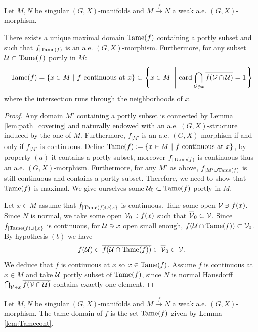 \begin{lem}\label{lem:Tamecont}
Let $M,N$ be singular $(G,X)$-manifolds and $M\xrightarrow{f} N$ a weak a.e. $(G,X)$-morphism.

There exists a unique maximal domain $\mathrm{Tame}(f)$ containing a portly subset and such that $f_{|\mathrm{Tame}(f)}$ is an a.e. $(G,X)$-morphism.
Furthermore, for any subset $\mathcal{U}\subset\mathrm{Tame}(f)$ portly in $M$:  $$\mathrm{Tame}(f) = \{x\in M ~|~ f \text{ continuous at } x\} \subset \left\{x\in M ~\left|~ \mathrm{card}\bigcap_{ \mathcal V \ni x} \overline{f(\mathcal V \cap \mathcal{U})}=1 \right. \right\}$$
where the intersection runs through the neighborhoods of $x$.
\end{lem}
\begin{proof}



Any domain $M'$ containing a portly subset is connected by 
Lemma \ref{lem:path_covering} and naturally endowed with an a.e. $(G,X)$-structure induced by the one of $M$. Furthermore, $f_{|M'}$ is an a.e. $(G,X)$-morphism if and only if $f_{|M'}$ is continuous.
Define $\mathrm{Tame}(f):= \{x\in M ~|~ f \text{ continuous at } x\}$, by property $(a)$ it contains a portly subset, moreover $f_{|\mathrm{Tame}(f)}$ is continuous thus an a.e. $(G,X)$-morphism.
Furthermore, for any $M'$ as above, $f_{|M'\cup\mathrm{Tame}(f)}$ is still continuous and contains a portly subset. 
Therefore, we need to show that $\mathrm{Tame}(f)$ is maximal. We give ourselves some $\mathcal{U}_0 \subset \mathrm{Tame}(f)$ portly in $M$.

Let $x\in M$ assume that $f_{|\mathrm{Tame}(f)\cup \{x\}}$ is continuous. Take some open $\mathcal V\ni f(x)$. Since $N$ is normal, we take some open $\mathcal V_0\ni f(x)$ such that $\overline {\mathcal V}_0 \subset \mathcal V$. Since $f_{|\mathrm{Tame}(f)\cup\{x\}}$ is continuous, for $\mathcal{U}\ni x $ open small enough,  $f(\mathcal{U}\cap \mathrm{Tame}(f))\subset \mathcal V_0$. By  hypothesis $(b)$ we have 
$$f(\mathcal{U}) \subset \overline{f(\mathcal{U}\cap\mathrm{Tame}(f))} \subset \overline {\mathcal V}_0 \subset \mathcal V.$$
We deduce that $f$ is continuous at $x$ so $x\in \mathrm{Tame}(f)$.
Assume $f$ is continuous at $x\in M$ and take $\mathcal{U}$ portly subset of $\mathrm{Tame}(f)$, since $N$ is normal Hausdorff 
$\bigcap_{\mathcal V\ni x}\overline{f(\mathcal V\cap \mathcal{U})}$ contains exactly one element. 

\end{proof}
\begin{defi}\label{def:tame_domain} Let $M,N$ be singular $(G,X)$-manifolds and $M\xrightarrow{f} N$ a weak a.e. $(G,X)$-morphism. The tame domain of $f$ is the set $\mathrm{Tame}(f)$ given by Lemma \ref{lem:Tamecont}.
\end{defi}

